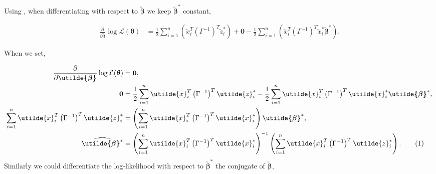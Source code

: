 \documentclass[honours,12pt]{unswthesis}
\newcommand{\ta}{\bm{\theta}}
\newcommand{\augb}{\bm{\utilde{\beta}}}
\newcommand\numberthis{\addtocounter{equation}{1}\tag{\theequation}}
\numberwithin{equation}{section}
\begin{document}
\noindent Using , when differentiating with respect to $\augb$ we keep $\augb^{*}$ constant,

\begin{align*}
	\frac{\partial}{\partial \augb} \log{\mathcal{L}(\ta)} &= \frac{1}{2} \sum_{i=1}^{n} \left(  \utilde{x}_{i}^{T} \left( \Gamma^{-1} \right)^{T} \utilde{z}_{i}^{*} \right) + \mathbf{0} - \frac{1}{2} \sum_{i=1}^{n} \left(  \utilde{x}_{i}^{T} \left( \Gamma^{-1} \right)^{T} \utilde{x}_{i}^{*} \augb^{*} \right).
\end{align*}

\noindent When we set,

\begin{align*}
	\frac{\partial}{\partial \augb} \log{\mathcal{L}(\ta)} &= \mathbf{0},\\
	\mathbf{0} &= \frac{1}{2} \sum_{i=1}^{n} \utilde{x}_{i}^{T} \left( \Gamma^{-1} \right)^{T} \utilde{z}_{i}^{*} - \frac{1}{2} \sum_{i=1}^{n} \utilde{x}_{i}^{T} \left( \Gamma^{-1} \right)^{T} \utilde{x}_{i}^{*} \augb^{*},\\
	\sum_{i=1}^{n} \utilde{x}_{i}^{T} \left( \Gamma^{-1} \right)^{T} \utilde{z}_{i}^{*} &= \left( \sum_{i=1}^{n} \utilde{x}_{i}^{T} \left( \Gamma^{-1} \right)^{T} \utilde{x}_{i}^{*} \right) \augb^{*},\\
	\widehat{\augb^{*}} &= \left( \sum_{i=1}^{n} \utilde{x}_{i}^{T} \left( \Gamma^{-1} \right)^{T} \utilde{x}_{i}^{*} \right)^{-1} \left( \sum_{i=1}^{n} \utilde{x}_{i}^{T} \left( \Gamma^{-1} \right)^{T} \utilde{z}_{i}^{*} \right). \numberthis \label{betaconjugateestimate}
\end{align*}
\noindent Similarly we could differentiate the log-likelihood with respect to $\augb^{*}$ the conjugate of $\augb$,
\end{document}

